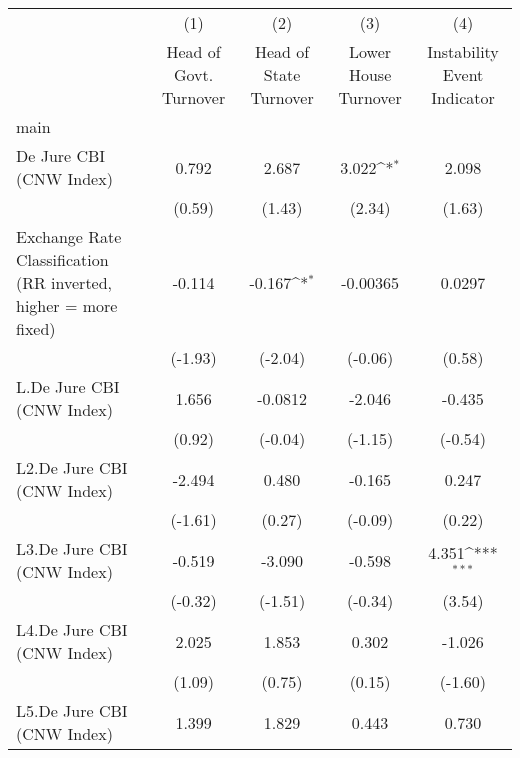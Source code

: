 {
\def\sym#1{\ifmmode^{#1}\else\(^{#1}\)\fi}
\begin{longtable}{l*{4}{c}}
\toprule\endfirsthead\midrule\endhead\midrule\endfoot\endlastfoot
                &\multicolumn{1}{c}{(1)}&\multicolumn{1}{c}{(2)}&\multicolumn{1}{c}{(3)}&\multicolumn{1}{c}{(4)}\\
                &\multicolumn{1}{c}{Head of Govt. Turnover}&\multicolumn{1}{c}{Head of State Turnover}&\multicolumn{1}{c}{Lower House Turnover}&\multicolumn{1}{c}{Instability Event Indicator}\\
\midrule
main            &                  &                  &                  &                  \\
De Jure CBI (CNW Index)&    0.792         &    2.687         &    3.022\sym{*}  &    2.098         \\
                &   (0.59)         &   (1.43)         &   (2.34)         &   (1.63)         \\
\addlinespace
Exchange Rate Classification (RR inverted, higher = more fixed)&   -0.114         &   -0.167\sym{*}  & -0.00365         &   0.0297         \\
                &  (-1.93)         &  (-2.04)         &  (-0.06)         &   (0.58)         \\
\addlinespace
L.De Jure CBI (CNW Index)&    1.656         &  -0.0812         &   -2.046         &   -0.435         \\
                &   (0.92)         &  (-0.04)         &  (-1.15)         &  (-0.54)         \\
\addlinespace
L2.De Jure CBI (CNW Index)&   -2.494         &    0.480         &   -0.165         &    0.247         \\
                &  (-1.61)         &   (0.27)         &  (-0.09)         &   (0.22)         \\
\addlinespace
L3.De Jure CBI (CNW Index)&   -0.519         &   -3.090         &   -0.598         &    4.351\sym{***}\\
                &  (-0.32)         &  (-1.51)         &  (-0.34)         &   (3.54)         \\
\addlinespace
L4.De Jure CBI (CNW Index)&    2.025         &    1.853         &    0.302         &   -1.026         \\
                &   (1.09)         &   (0.75)         &   (0.15)         &  (-1.60)         \\
\addlinespace
L5.De Jure CBI (CNW Index)&    1.399         &    1.829         &    0.443         &    0.730         \\

\end{longtable}}
